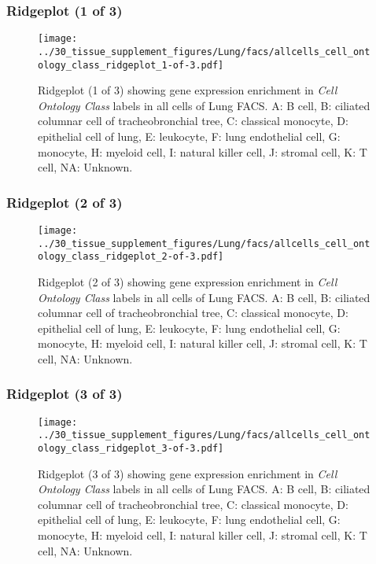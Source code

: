 \clearpage

\subsubsection{Ridgeplot (1 of 3)}
\begin{figure}[h]
\centering
\texttt{[image: ../30\_tissue\_supplement\_figures/Lung/facs/allcells\_cell\_ontology\_class\_ridgeplot\_1-of-3.pdf]}

\caption{ Ridgeplot (1 of 3)  showing gene expression enrichment in \emph{Cell Ontology Class} labels in all cells of Lung FACS. A: B cell, B: ciliated columnar cell of tracheobronchial tree, C: classical monocyte, D: epithelial cell of lung, E: leukocyte, F: lung endothelial cell, G: monocyte, H: myeloid cell, I: natural killer cell, J: stromal cell, K: T cell, NA: Unknown.}
\end{figure}


\clearpage

\subsubsection{Ridgeplot (2 of 3)}
\begin{figure}[h]
\centering
\texttt{[image: ../30\_tissue\_supplement\_figures/Lung/facs/allcells\_cell\_ontology\_class\_ridgeplot\_2-of-3.pdf]}

\caption{ Ridgeplot (2 of 3)  showing gene expression enrichment in \emph{Cell Ontology Class} labels in all cells of Lung FACS. A: B cell, B: ciliated columnar cell of tracheobronchial tree, C: classical monocyte, D: epithelial cell of lung, E: leukocyte, F: lung endothelial cell, G: monocyte, H: myeloid cell, I: natural killer cell, J: stromal cell, K: T cell, NA: Unknown.}
\end{figure}


\clearpage

\subsubsection{Ridgeplot (3 of 3)}
\begin{figure}[h]
\centering
\texttt{[image: ../30\_tissue\_supplement\_figures/Lung/facs/allcells\_cell\_ontology\_class\_ridgeplot\_3-of-3.pdf]}

\caption{ Ridgeplot (3 of 3)  showing gene expression enrichment in \emph{Cell Ontology Class} labels in all cells of Lung FACS. A: B cell, B: ciliated columnar cell of tracheobronchial tree, C: classical monocyte, D: epithelial cell of lung, E: leukocyte, F: lung endothelial cell, G: monocyte, H: myeloid cell, I: natural killer cell, J: stromal cell, K: T cell, NA: Unknown.}
\end{figure}


